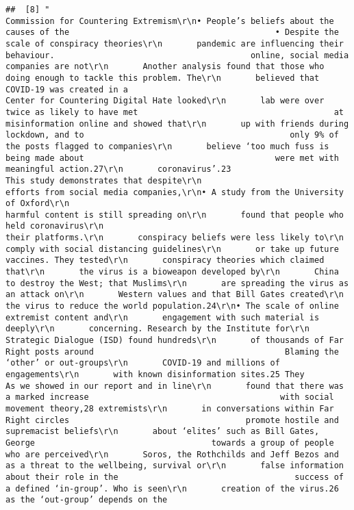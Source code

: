 \documentclass[
]{book}
\begin{document}
\begin{verbatim}
##  [8] "                                                     Commission for Countering Extremism\r\n• People’s beliefs about the causes of the                                          • Despite the scale of conspiracy theories\r\n       pandemic are influencing their behaviour.                                        online, social media companies are not\r\n       Another analysis found that those who                                            doing enough to tackle this problem. The\r\n       believed that COVID-19 was created in a                                          Center for Countering Digital Hate looked\r\n       lab were over twice as likely to have met                                        at misinformation online and showed that\r\n       up with friends during lockdown, and to                                          only 9% of the posts flagged to companies\r\n       believe ‘too much fuss is being made about                                       were met with meaningful action.27\r\n       coronavirus’.23                                                                  This study demonstrates that despite\r\n                                                                                        efforts from social media companies,\r\n• A study from the University of Oxford\r\n                                                                                        harmful content is still spreading on\r\n       found that people who held coronavirus\r\n                                                                                        their platforms.\r\n       conspiracy beliefs were less likely to\r\n       comply with social distancing guidelines\r\n       or take up future vaccines. They tested\r\n       conspiracy theories which claimed that\r\n       the virus is a bioweapon developed by\r\n       China to destroy the West; that Muslims\r\n       are spreading the virus as an attack on\r\n       Western values and that Bill Gates created\r\n       the virus to reduce the world population.24\r\n• The scale of online extremist content and\r\n       engagement with such material is deeply\r\n       concerning. Research by the Institute for\r\n       Strategic Dialogue (ISD) found hundreds\r\n       of thousands of Far Right posts around                                       Blaming the ‘other’ or out-groups\r\n       COVID-19 and millions of engagements\r\n       with known disinformation sites.25 They                                      As we showed in our report and in line\r\n       found that there was a marked increase                                       with social movement theory,28 extremists\r\n       in conversations within Far Right circles                                    promote hostile and supremacist beliefs\r\n       about ‘elites’ such as Bill Gates, George                                    towards a group of people who are perceived\r\n       Soros, the Rothchilds and Jeff Bezos and                                     as a threat to the wellbeing, survival or\r\n       false information about their role in the                                    success of a defined ‘in-group’. Who is seen\r\n       creation of the virus.26                                                     as the ‘out-group’ depends on the 
\end{verbatim}
\end{document}
